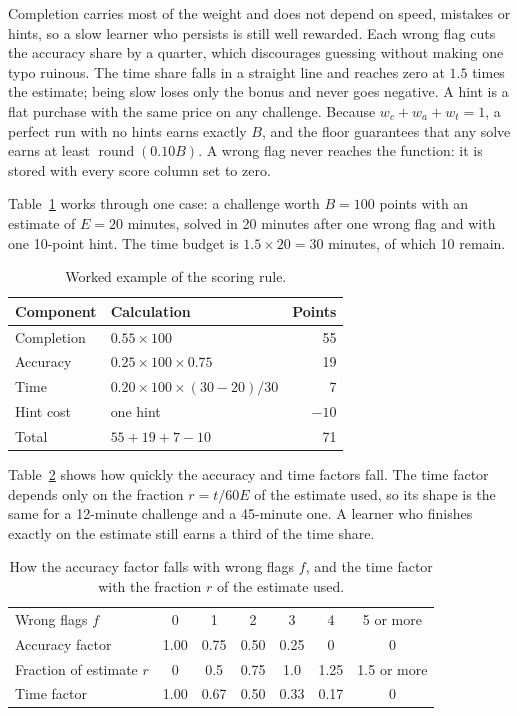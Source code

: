 Completion carries most of the weight and does not depend on speed, mistakes or hints, so a slow learner who persists is still well rewarded. Each wrong flag cuts the accuracy share by a quarter, which discourages guessing without making one typo ruinous. The time share falls in a straight line and reaches zero at $1.5$ times the estimate; being slow loses only the bonus and never goes negative. A hint is a flat purchase with the same price on any challenge. Because $w_c + w_a + w_t = 1$, a perfect run with no hints earns exactly $B$, and the floor guarantees that any solve earns at least $\operatorname{round}(0.10B)$. A wrong flag never reaches the function: it is stored with every score column set to zero.

Table~\ref{tab:example} works through one case: a challenge worth $B = 100$ points with an estimate of $E = 20$ minutes, solved in 20 minutes after one wrong flag and with one 10-point hint. The time budget is $1.5 \times 20 = 30$ minutes, of which 10 remain.

\begin{table}[!htbp]
\centering
\caption{Worked example of the scoring rule.}
\label{tab:example}
\tablefont
\begin{tabular}{@{}l l r@{}}
\toprule
\textbf{Component} & \textbf{Calculation} & \textbf{Points} \\
\midrule
Completion & $0.55 \times 100$ & 55 \\
Accuracy & $0.25 \times 100 \times 0.75$ & 19 \\
Time & $0.20 \times 100 \times (30 - 20) / 30$ & 7 \\
Hint cost & one hint & $-10$ \\
\midrule
Total & $55 + 19 + 7 - 10$ & 71 \\
\bottomrule
\end{tabular}
\end{table}

Table~\ref{tab:sensitivity} shows how quickly the accuracy and time factors fall. The time factor depends only on the fraction $r = t / 60E$ of the estimate used, so its shape is the same for a 12-minute challenge and a 45-minute one. A learner who finishes exactly on the estimate still earns a third of the time share.

\begin{table}[!htbp]
\centering
\caption{How the accuracy factor falls with wrong flags $f$, and the time factor with the fraction $r$ of the estimate used.}
\label{tab:sensitivity}
\tablefont
\begin{tabular}{@{}l c c c c c c@{}}
\toprule
Wrong flags $f$ & 0 & 1 & 2 & 3 & 4 & 5 or more \\
Accuracy factor & 1.00 & 0.75 & 0.50 & 0.25 & 0 & 0 \\
\midrule
Fraction of estimate $r$ & 0 & 0.5 & 0.75 & 1.0 & 1.25 & 1.5 or more \\
Time factor & 1.00 & 0.67 & 0.50 & 0.33 & 0.17 & 0 \\
\bottomrule
\end{tabular}
\end{table}

